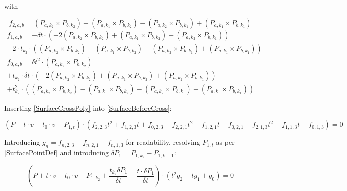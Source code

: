 with

\begin{equation}\label{SurfaceFStart}
    f_{2, a, b} = (P_{a, k_2} \times P_{b, k_2})
    - (P_{a, k_1} \times P_{b, k_2})
    - (P_{a, k_2} \times P_{b, k_1})
    + (P_{a, k_1} \times P_{b, k_1})
\end{equation}
\begin{equation}
    \begin{split}
        f_{1, a, b} = - \delta t \cdot (
        - 2 (P_{a, k_2} \times P_{b, k_2})
        + (P_{a, k_1} \times P_{b, k_2})
        + (P_{a, k_2} \times P_{b, k_1})
        )
        \\
        - 2 \cdot t_{k_2} \cdot (
        (P_{a, k_2} \times P_{b, k_2})
        - (P_{a, k_1} \times P_{b, k_2})
        - (P_{a, k_2} \times P_{b, k_1})
        + (P_{a, k_1} \times P_{b, k_1})
        )
    \end{split}
\end{equation}
\begin{equation}\label{SurfaceFEnd}
    \begin{split}
        f_{0, a, b} = \delta t^2 \cdot (P_{a, k_2} \times P_{b, k_2})
        \\
        + t_{k_2} \cdot \delta t \cdot (
        - 2 (P_{a, k_2} \times P_{b, k_2})
        + (P_{a, k_1} \times P_{b, k_2})
        + (P_{a, k_2} \times P_{b, k_1})
        )
        \\
        + t_{k_2}^2 \cdot (
        (P_{a, k_2} \times P_{b, k_2})
        - (P_{a, k_1} \times P_{b, k_2})
        - (P_{a, k_2} \times P_{b, k_1})
        + (P_{a, k_1} \times P_{b, k_1})
        )
    \end{split}
\end{equation}

Inserting \eqref{SurfaceCrossPoly} into \eqref{SurfaceBeforeCross}:

\begin{equation*}
    (P + t \cdot v - t_0 \cdot v - P_{1, t}) \cdot
    (f_{2, 2, 3} t^2 + f_{1, 2, 3} t + f_{0, 2, 3} - f_{2, 2, 1} t^2 - f_{1, 2, 1} t - f_{0, 2, 1} - f_{2, 1, 3} t^2 - f_{1, 1, 3} t - f_{0, 1, 3})
    = 0
\end{equation*}

Introducing \(g_n = f_{n, 2, 3} - f_{n, 2, 1} - f_{n, 1, 3}\) for readability,
resolving \(P_{1, t}\) as per \eqref{SurfacePointDef} and introducing \(\delta P_1 = P_{1, k_2} - P_{1, k-1}\):

\begin{equation}
    (P + t \cdot v - t_0 \cdot v - P_{1, k_2} + \frac{t_{k_2} \delta P_1}{\delta t} - \frac{t \cdot \delta P_1}{\delta t}) \cdot
    (
    t^2 g_2
    + t g_1
    + g_0
    )
    = 0
\end{equation}


